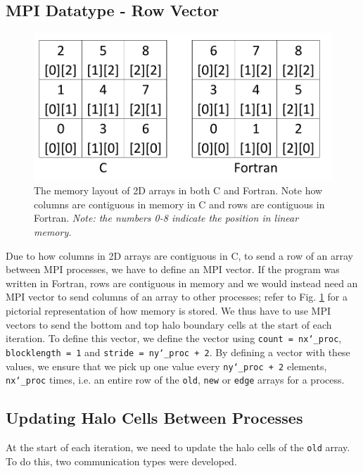 \documentclass[11pt, a4paper]{article}
\begin{document}
		\subsection{MPI Datatype - Row Vector} \label{sect:row_vector}
				\begin{figure}
					\centering
					\includegraphics[scale=0.4]{memory_layout.png}
					\caption{The memory layout of 2D arrays in both C and Fortran. Note how columns are contiguous in memory in C and rows are contiguous in Fortran. \textit{Note: the numbers 0-8 indicate the position in linear memory.}}
					\label{fig:memory_layout}
				\end{figure}
				
			Due to how columns in 2D arrays are contiguous in C, to send a row of an array between MPI processes, we have to define an MPI vector. If the program was written in Fortran, rows are contiguous in memory and we would instead need an MPI vector to send columns of an array to other processes; refer to Fig. \ref{fig:memory_layout} for a pictorial representation of how memory is stored. We thus have to use MPI vectors to send the bottom and top halo boundary cells at the start of each iteration. To define this vector, we define the vector using \texttt{count = nx\char`_proc}, \texttt{blocklength = 1} and \texttt{stride = ny\char`_proc + 2}. By defining a vector with these values, we ensure that we pick up one value every \texttt{ny\char`_proc + 2} elements, \texttt{nx\char`_proc} times, i.e. an entire row of the \texttt{old}, \texttt{new} or \texttt{edge} arrays for a process.	
				
		\subsection{Updating Halo Cells Between Processes}
			At the start of each iteration, we need to update the halo cells of the \texttt{old} array. To do this, two communication types were developed.
			
\end{document}

